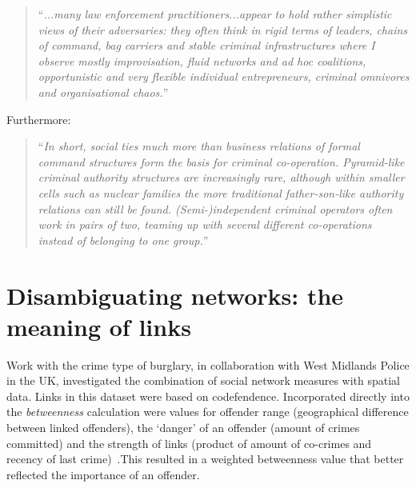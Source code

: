 \documentclass[conference]{IEEEtran}
\theoremstyle{definition}
\begin{document}
\begin{quote} 
``{\emph{...many law enforcement practitioners...appear to
hold rather simplistic views of their adversaries: they often think in
rigid terms of leaders, chains of command, bag carriers and stable
criminal infrastructures where I observe mostly improvisation, fluid
networks and ad hoc coalitions, opportunistic and very flexible
individual entrepreneurs, criminal omnivores and organisational
chaos.}}''
\end{quote}

\noindent Furthermore: 

\begin{quote}
``{\emph{In short, social ties much more than business relations of formal
command structures form the basis for criminal
co-operation. Pyramid-like criminal authority structures are
increasingly rare, although within smaller cells such as nuclear
families the more traditional father-son-like authority relations can
still be found. (Semi-)independent criminal operators often work in
pairs of two, teaming up with several different co-operations instead
of belonging to one group.}}''
\end{quote}


\section{Disambiguating networks: the meaning of links}\label{sec:disambiguating}
Work with the crime type of burglary, in collaboration with West
Midlands Police in the UK, investigated the combination of social
network measures with spatial data. Links in this dataset were based
on codefendence. Incorporated directly into the \emph{betweenness}
calculation were values for offender range (geographical difference
between linked offenders), the `danger' of an offender (amount of
crimes committed) and the strength of links (product of amount of
co-crimes and recency of last crime)~\cite{OatleyEwart2005}.This
resulted in a weighted betweenness value that better reflected the
importance of an offender.
\end{document}
